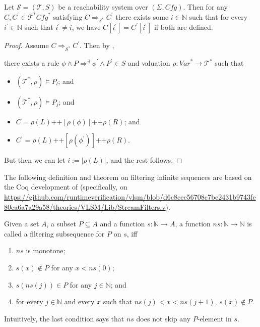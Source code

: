 \begin{lemma}\label{lem:atMostOneComponentChanges}
    Let $\mathcal{S} = (\mathcal{T}, S)$ be a reachability system over $(\Sigma, \mathit{Cfg})$.
    Then for any $C,C^\prime \in \mathcal{T}^*{\mathit{Cfg}^*}$ satisfying $C \Rightarrow_{\mathcal{S}^*} C^\prime$
    there exists some $i \in \mathbb{N}$ such that
    for every $i^\prime \in \mathbb{N}$ such that $i^\prime \not = i$,
    we have $C[i^\prime] = C^\prime[i^\prime]$ if both are defined.
\end{lemma}
\begin{proof}
Assume $C \Rightarrow_{\mathcal{S}^*} C^\prime$.
Then by ,
\begin{proofenv}
    there exists a rule $\phi \land P \Rightarrow^\exists \phi^\prime \land P^\prime \in S$
    and valuation $\rho : \mathit{Var}^* \to \mathcal{T}^*$ such that
    \begin{itemize}
        \item $(\mathcal{T}^*, \rho) \vDash P_l$; and
        \item $(\mathcal{T}^*, \rho) \vDash P_j$; and
        \item $C = \rho(L) \texttt{++} [\rho(\phi)] \texttt{++} \rho(R)$; and
        \item $C^\prime = \rho(L) \texttt{++} [\rho(\phi^\prime)] 
        \texttt{++} \rho(R)$.
    \end{itemize}
\end{proofenv}
But then we can let $i := |\rho(L)|$, and the rest follows.
\end{proof}


The following definition and theorem on filtering infinite sequences
are based on the Coq development of \cite{ZamfirVLSM}
(specifically, on \url{https://github.com/runtimeverification/vlsm/blob/d6c8cee56708c7be2431b9743fe80ca6a7a29a58/theories/VLSM/Lib/StreamFilters.v}).
\begin{definition}\label{def:filteringSubsequence}
Given a set $A$, a subset $P \subseteq A$ and a function $s : \mathbb{N} \to A$,
a function $\mathit{ns} : \mathbb{N} \to \mathbb{N}$ is called a filtering subsequence for $P$ on $s$,
iff
\begin{enumerate}
    \item $\mathit{ns}$ is monotone;
    \item $s(x) \not \in P$ for any $x < ns(0)$;
    \item $s(\mathit{ns}(j)) \in P$ for any $j \in \mathbb{N}$; and
    \item for every $j \in \mathbb{N}$ and every $x$ such that $\mathit{ns}(j) < x < \mathit{ns}(j+1)$,
          $s(x) \not\in P$.
\end{enumerate}
Intuitively, the last condition says that $ns$ does not skip any $P$-element in $s$.
\end{definition}

